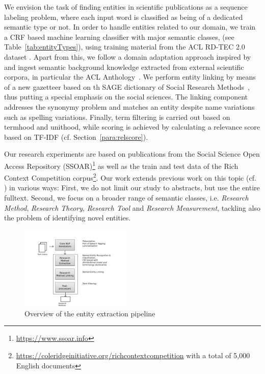 We envision the task of finding entities in scientific publications as a sequence labeling problem, 
where each input word is classified as being of a dedicated semantic type or not.
In order to handle entities related to our domain, we train a CRF based machine learning classifier with major semantic classes,
(see Table~\ref{tab:entityTypes}), 
using training material from the ACL RD-TEC 2.0 dataset \cite{qasemizadeh2016acl}.
Apart from this, we follow a domain adaptation approach inspired by \cite{agerri2016robust} and ingest semantic background knowledge extracted from external scientific corpora, in particular the ACL Anthology~\cite{bird2008acl,gildea2018acl}.
We perform entity linking by means of a new gazetteer based on th SAGE dictionary of Social Research Methods~\cite{lewis2003sage}, thus putting a special emphasis on the social sciences. 
The linking component addresses the synonymy problem and matches an entity despite name variations such as spelling variations. 
Finally, term filtering is carried out based on termhood and unithood, while scoring is achieved by calculating a relevance score based on TF-IDF (cf. Section~\ref{para:relscore}).

Our research experiments are based on publications from the Social Science Open Access Repository (SSOAR)\footnote{\url{https://www.ssoar.info}} as well as the train and test data of the Rich Context Competition corpus\footnote{\url{https://coleridgeinitiative.org/richcontextcompetition}
with a total of 5,000 English documents}.
Our work extends previous work on this topic (cf. \cite{eckle2013automatically}) in various ways: First, we do not limit our study to abstracts, but use the entire fulltext. Second, we focus on a broader range of semantic classes, 
i.e. \textit{Research Method}, \textit{Research Theory}, \textit{Research Tool} and \textit{Research Measurement}, tackling also the problem of identifying novel entities.
 


\begin{figure}[t]
\centering
    \includegraphics[width=0.47\textwidth]{figures/research-methods-pipeline.png}
    \caption{Overview of the entity extraction pipeline}
\label{fig:pipeline}
\end{figure}



